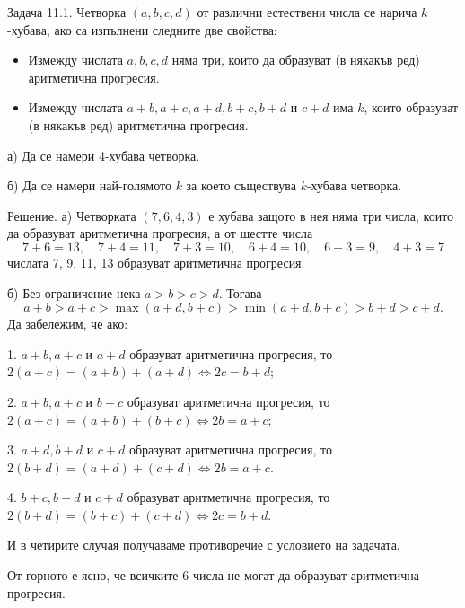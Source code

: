 
Задача 11.1. Четворка $(a,b,c,d)$ от различни естествени числа се нарича $k$-хубава, ако са изпълнени следните две свойства:
\begin{itemize}
\item Измежду числата $a,b,c,d$ няма три, които да образуват (в някакъв ред) аритметична прогресия.
\item Измежду числата $a+b,a+c,a+d,b+c,b+d$ и $c+d$ има $k$, които образуват (в някакъв ред) аритметична прогресия.
\end{itemize}
а) Да се намери 4-хубава четворка.

б) Да се намери най-голямото $k$ за което съществува $k$-хубава четворка.

Решение. а) Четворката $(7,6,4,3)$ е хубава защото в нея няма три числа, които да образуват аритметична прогресия, а от шестте числа
$$
7+6=13,\quad 7+4=11,\quad 7+3=10,\quad 6+4=10,\quad 6+3=9,\quad 4+3=7
$$
числата 7, 9, 11, 13 образуват аритметична прогресия.

б) Без ограничение нека $a>b>c>d$. Тогава
$$
a+b>a+c>\max(a+d,b+c)>\min(a+d,b+c)>b+d>c+d.
$$
Да забележим, че ако:

1. $a+b,a+c$ и $a+d$ образуват аритметична прогресия, то $2(a+c)=(a+b)+(a+d)\Longleftrightarrow 2c=b+d$;

2. $a+b,a+c$ и $b+c$ образуват аритметична прогресия, то $2(a+c)=(a+b)+(b+c)\Longleftrightarrow 2b=a+c$;

3. $a+d,b+d$ и $c+d$ образуват аритметична прогресия, то $2(b+d)=(a+d)+(c+d)\Longleftrightarrow 2b=a+c$.

4. $b+c,b+d$ и $c+d$ образуват аритметична прогресия, то $2(b+d)=(b+c)+(c+d)\Longleftrightarrow 2c=b+d$.

И в четирите случая получаваме противоречие с условието на задачата.

От горното е ясно, че всичките 6 числа не могат да образуват аритметична прогресия.

